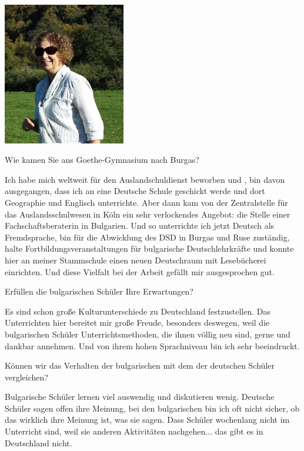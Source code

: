 \begin{multicols}{3}

  \noindent \includegraphics[width=2.1in]{./Brigitte/6.jpg}

Wie kamen Sie ans Goethe-Gymnasium nach Burgas?

Ich habe mich weltweit  für den Auslandschuldienst beworben und , bin davon ausgegangen, dass ich an eine Deutsche Schule geschickt werde und dort Geographie und Englisch unterrichte. 
Aber dann kam von der Zentralstelle für das Auslandsschulwesen in Köln ein sehr verlockendes Angebot: die Stelle einer Fachschaftsberaterin in Bulgarien. Und so unterrichte ich jetzt Deutsch als Fremdsprache, bin für die Abwicklung des DSD in Burgas und Ruse zuständig, halte Fortbildungsveranstaltungen für bulgarische Deutschlehrkräfte und konnte hier an meiner Stammschule einen neuen Deutschraum mit Lesebücherei einrichten. Und diese Vielfalt bei der Arbeit gefällt mir ausgesprochen gut. 

Erfüllen die bulgarischen Schüler  Ihre Erwartungen?

Es sind schon große Kulturunterschiede zu Deutschland festzustellen. Das Unterrichten hier bereitet mir große Freude, besonders deswegen, weil die bulgarischen Schüler Unterrichtsmethoden, die ihnen völlig neu sind, gerne und dankbar annehmen. Und von ihrem hohen Sprachniveau bin ich sehr beeindruckt. 

Können wir das Verhalten der bulgarischen mit dem der deutschen Schüler vergleichen?

Bulgarische Schüler lernen viel auswendig und diskutieren wenig. Deutsche Schüler sagen offen ihre Meinung, bei den bulgarischen bin ich oft nicht sicher, ob das wirklich ihre Meinung ist, was sie sagen.
Dass Schüler wochenlang nicht im Unterricht sind, weil sie anderen Aktivitäten nachgehen... das gibt es in Deutschland nicht. 


\end{multicols}
